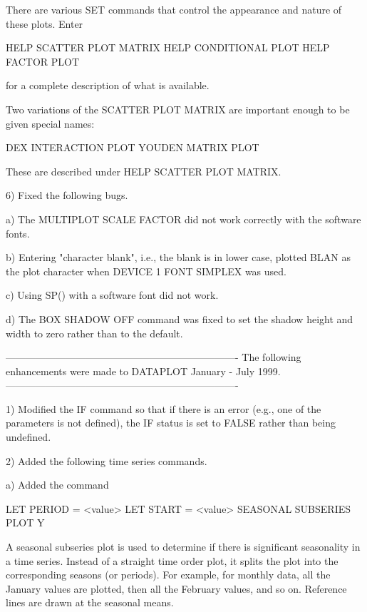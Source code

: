 {    There are various SET commands that control the appearance
    and nature of these plots.  Enter

        HELP SCATTER PLOT MATRIX
        HELP CONDITIONAL PLOT
        HELP FACTOR PLOT

    for a complete description of what is available.

    Two variations of the SCATTER PLOT MATRIX are important enough
    to be given special names:

         DEX INTERACTION PLOT
         YOUDEN MATRIX PLOT

    These are described under HELP SCATTER PLOT MATRIX.

 6) Fixed the following bugs.

    a) The MULTIPLOT SCALE FACTOR did not work correctly with
       the software fonts.

    b) Entering "character blank", i.e., the blank is in lower case,
       plotted BLAN as the plot character when DEVICE 1 FONT SIMPLEX
       was used.

    c) Using SP() with a software font did not work.

    d) The BOX SHADOW OFF command was fixed to set the shadow
       height and width to zero rather than to the default.



----------------------------------------------------------------------
The following enhancements were made to DATAPLOT January - July   1999.
----------------------------------------------------------------------

 1) Modified the IF command so that if there is an error (e.g., one
    of the parameters is not defined), the IF status is set to
    FALSE rather than being undefined.

 2) Added the following time series commands.

    a) Added the command 

         LET PERIOD = <value>
         LET START = <value>
         SEASONAL SUBSERIES PLOT Y

       A seasonal subseries plot is used to determine if there
       is significant seasonality in a time series.  Instead of
       a straight time order plot, it splits the plot into
       the corresponding seasons (or periods).  For example, for
       monthly data, all the January values are plotted, then all
       the February values, and so on.  Reference lines are drawn
       at the seasonal means.

}
